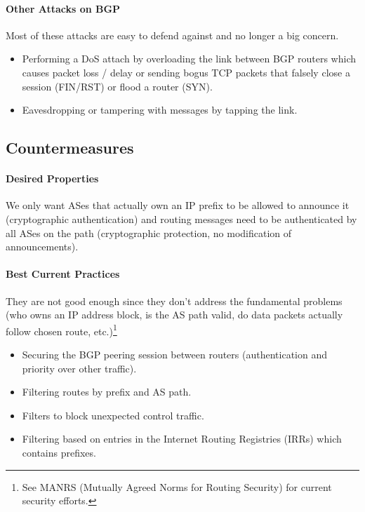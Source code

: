\paragraph{Other Attacks on BGP}
Most of these attacks are easy to defend against and no longer a big concern. %

\begin{itemize}
    \item Performing a DoS attach by overloading the link between BGP routers which causes packet loss / delay or sending bogus TCP packets that falsely close a session (FIN/RST) or flood a router (SYN).
    \item Eavesdropping or tampering with messages by tapping the link. %
\end{itemize}

\subsection{Countermeasures}

\paragraph{Desired Properties}
We only want ASes that actually own an IP prefix to be allowed to announce it (cryptographic authentication) and routing messages need to be authenticated by all ASes on the path (cryptographic protection, no modification of announcements).

\paragraph{Best Current Practices}
They are not good enough since they don't address the fundamental problems (who owns an IP address block, is the AS path valid, do data packets actually follow chosen route, etc.)\footnote{See MANRS (Mutually Agreed Norms for Routing Security) for current security efforts.}

\begin{itemize}
    \item Securing the BGP peering session between routers (authentication and priority over other traffic). %
    \item Filtering routes by prefix and AS path.
    \item Filters to block unexpected control traffic.
    \item Filtering based on entries in the Internet Routing Registries (IRRs) which contains prefixes.
\end{itemize}

